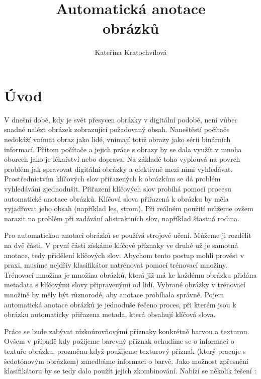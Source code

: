 \documentclass[czech,BP]{thesiskiv}
\author{Kateřina Kratochvílová}
\title{Automatická anotace\\obrázků}
\begin{document}
%
\maketitle
\tableofcontents

\chapter{Úvod}

\par V dnešní době, kdy je svět přesycen obrázky v digitální podobě, není vůbec snadné nalézt obrázek zobrazující požadovaný obsah. Naneštěstí počítače nedokáží vnímat obraz jako lidé, vnímají totiž obrazy jako sérii binárních informací. Přitom počítače a jejich práce s obrazy by se dala využít v mnoha oborech jako je lékařství nebo doprava. Na základě toho vyplouvá na povrch problém jak spravovat digitální obrázky a efektivně mezi nimi vyhledávat. Prostřednictvím klíčových slov přiřazených k obrázkům se dá problém vyhledávání zjednodušit. Přiřazení klíčových slov probíhá pomocí procesu automatické anotace obrázků. Klíčová slova přiřazená k obrázku by měla vyjadřovat jeho obsah (například les, strom). Při reálném použití můžeme ovšem narazit na problém při zadávání abstraktních slov, například šťastná rodina.  

\par Pro automatickou anotaci obrázků se používá strojové učení. Můžeme ji rozdělit na dvě části. V první části získáme klíčové příznaky ve druhé už je samotná anotace, tedy přidělení klíčových slov. Abychom tento postup mohli provést v praxi, musíme nejdřív klasifikátor natrénovat pomocí trénovací množiny. Trénovací množina je množina obrázků, která již má ke každému obrázku přidána metadata s klíčovými slovy připravenými od lidí. Vybrané obrázky v trénovací množině by měly být různorodé, aby anotace probíhala správně. Pojem automatická anotace obrázků je jednoduše řečeno proces, při kterém jsou k obrázku automaticky přiřazena metada, která obsahují klíčová slova. 

\par Práce se bude zabývat nízkoúrovňovými příznaky konkrétně barvou a texturou. Ovšem v případě kdy požijeme barevný příznak ochudíme se o informaci o textuře obrázku, prozměnu když použijeme texturový příznak (který pracuje s šedotónovým obrázkem) zanedbáme informaci o barvě. Jako možnost zpřesnění klasifikátoru by se tedy dalo použít jejich zkombinování. Nabízí se několik řešení \cite{DiplomovaBrno}:   
\end{document}
